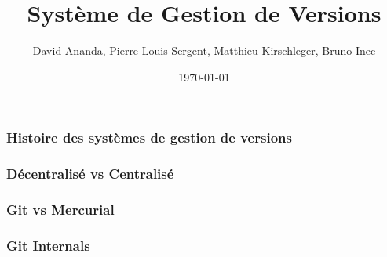 \documentclass{beamer}
\title{Système de Gestion de Versions}
\date{\today}
\author{David Ananda, Pierre-Louis Sergent, Matthieu Kirschleger, Bruno Inec}
\institute{IUT informatique Lyon1}
\begin{document}
  \maketitle
  \begin{frame}
    \frametitle{Histoire des systèmes de gestion de versions}

  \end{frame}
  \begin{frame}
    \frametitle{Décentralisé vs Centralisé}

  \end{frame}
  \begin{frame}
    \frametitle{Git vs Mercurial}

  \end{frame}
  \begin{frame}
    \frametitle{Git Internals}

  \end{frame}
\end{document}
